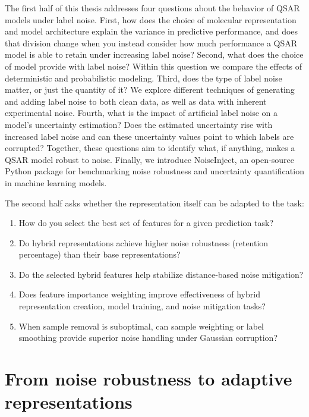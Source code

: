 The first half of this thesis addresses four questions about the behavior of QSAR models under label noise. First, how does the choice of molecular representation and model architecture explain the variance in predictive performance, and does that division change when you instead consider how much performance a QSAR model is able to retain under increasing label noise? Second, what does the choice of model provide with label noise? Within this question we compare the effects of deterministic and probabilistic modeling. Third, does the type of label noise matter, or just the quantity of it? We explore different techniques of generating and adding label noise to both clean data, as well as data with inherent experimental noise. Fourth, what is the impact of artificial label noise on a model's uncertainty estimation? Does the estimated uncertainty rise with increased label noise and can these uncertainty values point to which labels are corrupted? Together, these questions aim to identify what, if anything, makes a QSAR model robust to noise. Finally, we introduce NoiseInject, an open-source Python package for benchmarking noise robustness and uncertainty quantification in machine learning models.

The second half asks whether the representation itself can be adapted to the task:
\begin{enumerate}
    \item How do you select the best set of features for a given prediction task?
    \item Do hybrid representations achieve higher noise robustness (retention percentage) than their base representations?
    \item Do the selected hybrid features help stabilize distance-based noise mitigation?
    \item Does feature importance weighting improve effectiveness of hybrid representation creation, model training, and noise mitigation tasks?
    \item When sample removal is suboptimal, can sample weighting or label smoothing provide superior noise handling under Gaussian corruption?
\end{enumerate}

\section{From noise robustness to adaptive representations}


